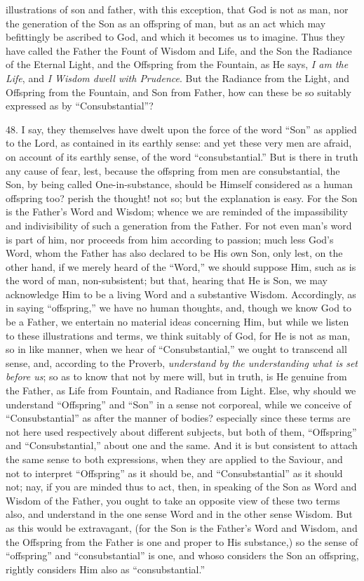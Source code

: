 illustrations of son and father, with this exception, that God is not
as man, nor the generation of the Son as an offspring of man, but as
an act which may befittingly be ascribed to God, and which it becomes
us to imagine. Thus they have called the Father the Fount of Wisdom
and Life, and the Son the Radiance of the Eternal Light, and the
Offspring from the Fountain, as He says, \emph{I am the Life}, and \emph{I
Wisdom dwell with Prudence}. But the Radiance from the Light, and
Offspring from the Fountain, and Son from Father, how can these be so
suitably expressed as by ``Consubstantial''?

48. I say, they themselves
have dwelt upon the force of the word ``Son'' as applied to the Lord, as
contained in its earthly sense: and yet these very men are afraid, on
account of its earthly sense, of the word ``consubstantial.'' But is
there in truth any cause of fear, lest, because the offspring from men
are consubstantial, the Son, by being called One-in-substance, should
be Himself considered as a human offspring too? perish the thought!
not so; but the explanation is easy. For the Son is the Father's Word
and Wisdom; whence we are reminded of the impassibility and
indivisibility of such a generation from the Father. For not even man's
word is part of him, nor proceeds from him according to passion; much
less God's Word, whom the Father has also declared to be His own Son,
only lest, on the other hand, if we merely heard of the ``Word,'' we
should suppose Him, such as is the word of man, non-subsistent;
but that, hearing that He is Son, we may acknowledge Him to be a
living Word and a substantive Wisdom. Accordingly, as in saying ``offspring,''
we have no human thoughts, and, though we know God to be a Father, we
entertain no material ideas concerning Him, but while we listen to
these illustrations and terms, we think suitably of God, for He is not
as man, so in like manner, when we hear of ``Consubstantial,'' we ought
to transcend all sense, and, according to the Proverb, \emph{understand
by the understanding what is set before us}; so as to know that not
by mere will, but in truth, is He genuine from the Father, as Life
from Fountain, and Radiance from Light. Else, why should we understand
``Offspring'' and ``Son'' in a sense not corporeal, while we conceive of ``Consubstantial''
as after the manner of bodies? especially since these terms are not
here used respectively about different subjects, but both of them, ``Offspring''
and ``Consubstantial,'' about one and the same. And it is but consistent
to attach the same sense to both expressions, when they are applied to
the Saviour, and not to interpret ``Offspring'' as it should be, and ``Consubstantial''
as it should not; nay, if you are minded thus to act, then, in
speaking of the Son as Word and Wisdom of the Father, you ought to
take an opposite view of these two terms also, and understand in the
one sense Word and in the other sense Wisdom. But as this would be
extravagant, (for the Son is the Father's Word and Wisdom, and the
Offspring from the Father is one and proper to His substance,) so the
sense of ``offspring'' and ``consubstantial'' is one, and whoso considers
the Son an offspring, rightly considers Him also as ``consubstantial.''


